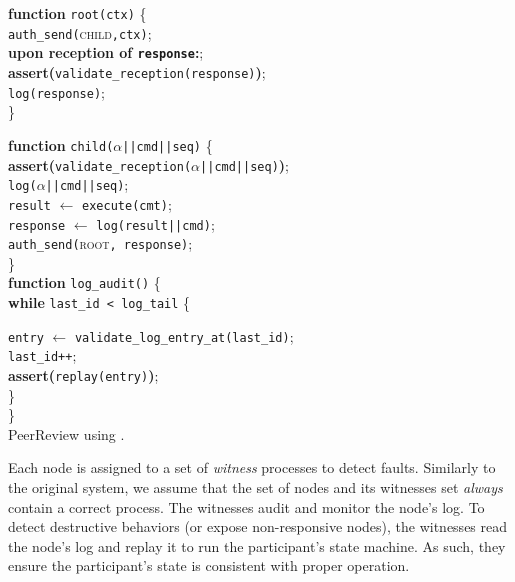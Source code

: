 \begin{algorithm}[t]
\SetAlgoLined
\small
\textbf{function} \texttt{root(ctx)} \{ \\
\Indp
 \texttt{auth\_send(}\textsc{child}{\tt,ctx)};\\
 {\bf upon reception of \texttt{response}:};\\
 \Indp
    {\bf assert(}\texttt{validate\_reception(response)}{\bf)};\\
    \texttt{log(response)};\\
\Indm
\Indm
\} \\

\vspace{0.15cm}

\textbf{function} \texttt{child($\alpha$||cmd||seq)} \{ \\
\Indp
    {\bf assert(}\texttt{validate\_reception($\alpha$||cmd||seq)}{\bf)};\\
    \texttt{log($\alpha$||cmd||seq)};\\
    {\tt result} $\leftarrow$ \texttt{execute(cmt)};\\
    {\tt response} $\leftarrow$ \texttt{log(result||cmd)};\\
    \texttt{auth\_send(}\textsc{root}{\tt, response)};\\
\Indm
\} \\
\vspace{0.15cm}
\textbf{function} \texttt{log\_audit()} \{ \\
\Indp
    {\bf{while}} \texttt{last\_id < log\_tail} \{\\
    \Indp

        \texttt{entry} $\leftarrow$ \texttt{validate\_log\_entry\_at(last\_id)};\\
        \texttt{last\_id++};\\
        {\bf assert(}\texttt{replay(entry)}{\bf{)}};\\
    \Indm
    \}\\
\Indm
\} \\
\caption{PeerReview using \projecttitle{}.}
\label{algo:tnic_accountability_protocol}
\end{algorithm}


Each node is assigned to a set of {\em witness} processes to detect faults. Similarly to the original system, we assume that the set of nodes and its witnesses set {\em always} contain a correct process. The witnesses audit and monitor the node's log. To detect destructive behaviors (or expose non-responsive nodes), the witnesses read the node's log and replay it to run the participant's state machine. As such, they ensure the participant's state is consistent with proper operation. 

